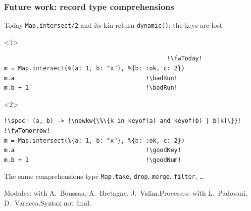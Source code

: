 \begin{frame}[fragile,t]
\frametitle{Future work: record type comprehensions}
{\color{gray}Today \texttt{Map.intersect/2} and its kin return \texttt{dynamic()}: the keys are lost\par}
\bigskip
\begin{block}{\vspace{-5mm}}
\begin{onlyenv}<1>
\begin{verbatim}
                                              !\fwToday!
m = Map.intersect(%{a: 1, b: "x"}, %{b: :ok, c: 2})
m.a                                     !\badRun!
m.b + 1                                 !\badRun!
\end{verbatim}
\end{onlyenv}
\begin{onlyenv}<2>
\begin{verbatim}
!\spec! (a, b) -> !\newkw{\%\{k in keyof(a) and keyof(b) | b[k]\}}!  !\fwTomorrow!
m = Map.intersect(%{a: 1, b: "x"}, %{b: :ok, c: 2})
m.a                                     !\goodKey!
m.b + 1                                 !\goodNum!
\end{verbatim}
\end{onlyenv}
\end{block}
\medskip
{\small\color{gray}The same comprehensions type \texttt{Map.take}, \texttt{drop}, \texttt{merge}, \texttt{filter}, \ldots\par}
\vfill
{\scriptsize\color{gray}Modules: with A.~Boussaa, A.~Bretagne, J.~Valim.\quad Processes: with L.~Padovani, D.~Varacca.\quad Syntax not final.\par}
\end{frame}


